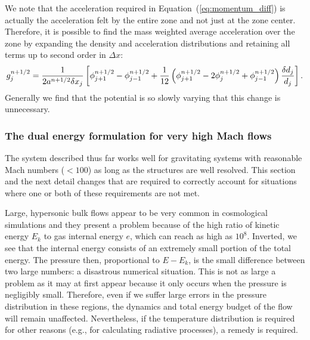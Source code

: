 We note that the acceleration required in Equation~(\ref{eq:momentum_diff}) is actually the
acceleration felt by the entire zone and not just at the zone center.
Therefore, it is possible to find the mass weighted average acceleration over the zone
by expanding the density and acceleration distributions and
retaining all terms up to second order in $\Delta x$:
%
\begin{equation}
g_j^{n+1/2} = 
       \frac{1}{2 a^{n+1/2} \delta x_j} \left[ 
             \phi_{j+1}^{n+1/2} 
           - \phi_{j-1}^{n+1/2} 
           + \frac{1}{12} \left(    \phi^{n+1/2}_{j+1} 
                                 - 2\phi^{n+1/2}_j 
                                 + \phi^{n+1/2}_{j-1} \right) 
                                   {\delta d_j \over d_j}
       \right].
       \label{eq:accel}
\end{equation}
Generally we find that the potential is so slowly varying that this change is unnecessary.


\subsubsection{The dual energy formulation for  very high Mach flows} %

The system described thus far works well for gravitating systems with
reasonable Mach numbers ($<100$) as long as the structures are well resolved.
This section and the next detail changes that are required
to correctly account for situations where one or both of these
requirements are not met.

Large, hypersonic bulk flows appear to be very common in cosmological
simulations and they present a problem because of the high ratio of
kinetic energy $E_k$ to gas internal energy $e$, which can reach as
high as $10^8$.  Inverted, we see that the internal energy consists of
an extremely small portion of the total energy.  The pressure then,
proportional to $E - E_{k}$, is the small difference between two large
numbers: a disastrous numerical situation.  This is not as large a
problem as it may at first appear because it only occurs when the
pressure is negligibly small.  Therefore, even if we suffer large
errors in the pressure distribution in these regions, the dynamics and
total energy budget of the flow will remain unaffected.  Nevertheless,
if the temperature distribution is required for other reasons
(e.g., for calculating radiative processes), a remedy is required.

